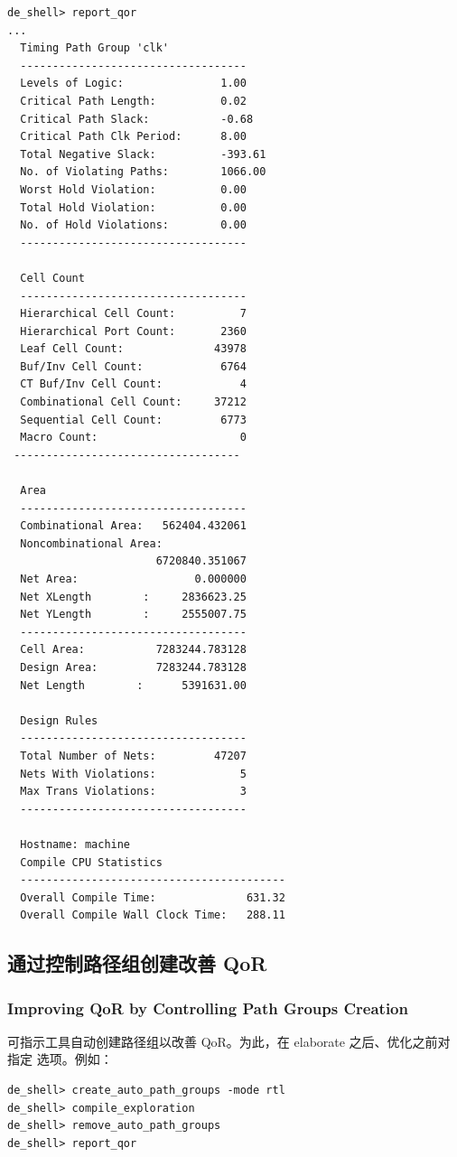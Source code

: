 \begin{lstlisting}[caption={report\_qor 报告示例},label=ex:report-qor]
de_shell> report_qor
...
  Timing Path Group 'clk'
  -----------------------------------
  Levels of Logic:               1.00
  Critical Path Length:          0.02
  Critical Path Slack:           -0.68
  Critical Path Clk Period:      8.00
  Total Negative Slack:          -393.61
  No. of Violating Paths:        1066.00
  Worst Hold Violation:          0.00
  Total Hold Violation:          0.00
  No. of Hold Violations:        0.00
  -----------------------------------

  Cell Count
  -----------------------------------
  Hierarchical Cell Count:          7
  Hierarchical Port Count:       2360
  Leaf Cell Count:              43978
  Buf/Inv Cell Count:            6764
  CT Buf/Inv Cell Count:            4
  Combinational Cell Count:     37212
  Sequential Cell Count:         6773
  Macro Count:                      0
 -----------------------------------

  Area
  -----------------------------------
  Combinational Area:   562404.432061
  Noncombinational Area:
                       6720840.351067
  Net Area:                  0.000000
  Net XLength        :     2836623.25
  Net YLength        :     2555007.75
  -----------------------------------
  Cell Area:           7283244.783128
  Design Area:         7283244.783128
  Net Length        :      5391631.00

  Design Rules
  -----------------------------------
  Total Number of Nets:         47207
  Nets With Violations:             5
  Max Trans Violations:             3
  -----------------------------------

  Hostname: machine
  Compile CPU Statistics
  -----------------------------------------
  Overall Compile Time:              631.32
  Overall Compile Wall Clock Time:   288.11
\end{lstlisting}

\subsection{通过控制路径组创建改善 QoR}
\subsubsection*{Improving QoR by Controlling Path Groups Creation}

可指示工具自动创建路径组以改善 QoR。为此，在 elaborate 之后、优化之前对  指定  选项。例如：
\begin{lstlisting}
de_shell> create_auto_path_groups -mode rtl
de_shell> compile_exploration
de_shell> remove_auto_path_groups
de_shell> report_qor
\end{lstlisting}

